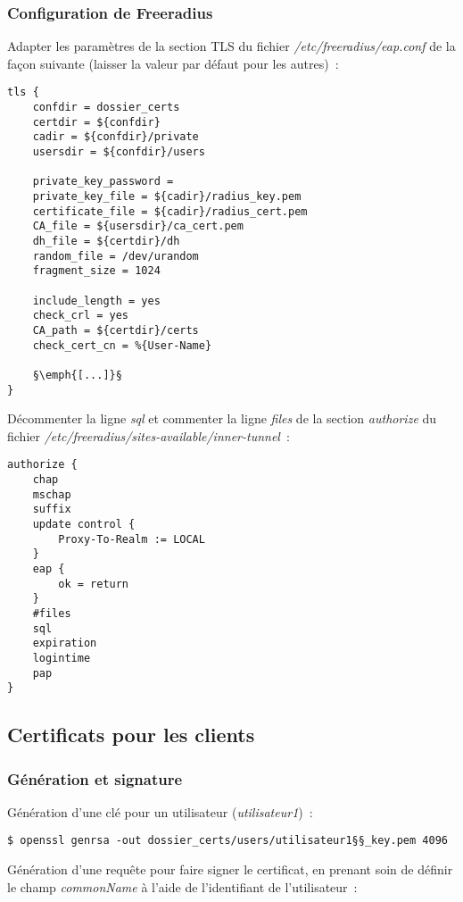 \subsubsection{Configuration de Freeradius}

Adapter les paramètres de la section TLS du fichier \emph{/etc/freeradius/eap.conf} de la façon suivante (laisser la valeur par défaut pour les autres)~:

\begin{lstlisting}
tls {
	confdir = dossier_certs 
	certdir = ${confdir}
	cadir = ${confdir}/private
	usersdir = ${confdir}/users

	private_key_password =
	private_key_file = ${cadir}/radius_key.pem
	certificate_file = ${cadir}/radius_cert.pem
	CA_file = ${usersdir}/ca_cert.pem
	dh_file = ${certdir}/dh
	random_file = /dev/urandom
	fragment_size = 1024

	include_length = yes
	check_crl = yes
	CA_path = ${certdir}/certs
	check_cert_cn = %{User-Name}

	§\emph{[...]}§
}
\end{lstlisting}

Décommenter la ligne \emph{sql} et commenter la ligne \emph{files} de la section \emph{authorize} du fichier \emph{/etc/freeradius/sites-available/inner-tunnel}~:

\begin{lstlisting}
authorize {
    chap
    mschap
    suffix
    update control {
        Proxy-To-Realm := LOCAL
    }
    eap {
        ok = return
    }
    #files
    sql
    expiration
    logintime
    pap
}
\end{lstlisting}

\subsection{Certificats pour les clients}
\subsubsection{Génération et signature}

Génération d'une clé pour un utilisateur (\emph{utilisateur1})~:

\begin{lstlisting}
$ openssl genrsa -out dossier_certs/users/utilisateur1§§_key.pem 4096
\end{lstlisting}

Génération d'une requête pour faire signer le certificat, en prenant soin de définir le champ \emph{commonName} à l'aide de l'identifiant de l'utilisateur~:

